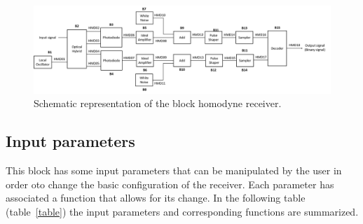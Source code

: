 \begin{figure}[h]
	\centering
	\includegraphics[width=\textwidth]{../lib/homodyne_receiver/figures/MQAM_receiver_block_diagram}
	\caption{Schematic representation of the block homodyne receiver.}\label{MQAM_receiver_block_diagram}
\end{figure}

\subsection*{Input parameters}

This block has some input parameters that can be manipulated by the user in order oto change the basic configuration of the receiver. Each parameter has associated a function that allows for its change. In the following table (table~\ref{table}) the input parameters and corresponding functions are summarized.

